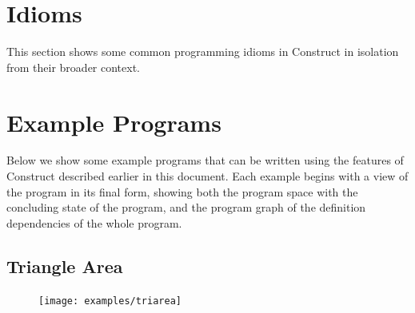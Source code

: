 \documentclass[twoside,11pt]{report}
\begin{document}
\section{Idioms}
\label{sec:idioms}

This section shows some common programming idioms in Construct in isolation from their broader context.

\section{Example Programs}
\label{sec:example}

Below we show some example programs that can be written using the features of Construct described earlier in this document. 
Each example begins with a view of the program in its final form, showing both the program space with the concluding state of the program, and the program graph of the definition dependencies of the whole program.

\pagebreak

\subsection{Triangle Area}
\label{subsec:triarea}

\begin{figure}[h]
  \centering
  \texttt{[image: examples/triarea]}
\end{figure}
\end{document}

